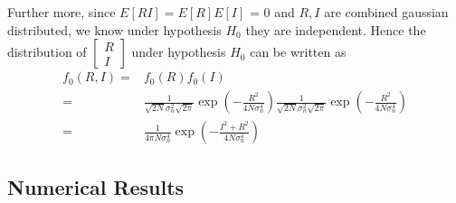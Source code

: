 Further more, since $E[RI] = E[R]E[I]$ = 0 and $R, I$ are combined gaussian distributed,  we know under hypothesis $H_0$ they are independent. Hence the distribution of $\begin{bmatrix}
  R \\
  I
\end{bmatrix}$ under hypothesis $H_0$ can be written as
\begin{equation}
  \begin{split}
	f_0(R, I)= &f_0(R)f_0(I)\\
	= &\frac{1}{\sqrt{2N}\sigma_n^2\sqrt{2\pi}}\exp\left( -\frac{R^2}{4N\sigma_n^4} \right)\frac{1}{\sqrt{2N}\sigma_n^2\sqrt{2\pi}}\exp\left( -\frac{R^2}{4N\sigma_n^4} \right)\\
	=&\frac{1}{4\pi N\sigma_n^4}\exp\left( -\frac{I^2+R^2}{4N\sigma_n^4} \right) 
  \end{split}
  \label{f0RO}
\end{equation}
\subsection{Numerical Results}

